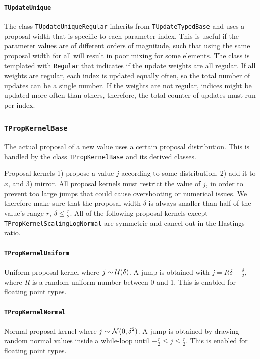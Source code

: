 \documentclass[a4paper,11pt]{article}
\newcommand{\class}[1]{\texttt{#1}}
\newcommand{\template}[1]{\texttt{#1}}
\begin{document}
\paragraph{\class{TUpdateUnique}}
The class \class{TUpdateUniqueRegular} inherits from \class{TUpdateTypedBase} and uses a proposal width that is specific to each parameter index. This is useful if the parameter values are of different orders of magnitude, such that using the same proposal width for all will result in poor mixing for some elements. The class is templated with \template{Regular} that indicates if the update weights are all regular. If all weights are regular, each index is updated equally often, so the total number of updates can be a single number. If the weights are not regular, indices might be updated more often than others, therefore, the total counter of updates must run per index.

\subsubsection{\class{TPropKernelBase}}
The actual proposal of a new value uses a certain proposal distribution. This is handled by the class \class{TPropKernelBase} and its derived classes.

Proposal kernels 1) propose a value $j$ according to some distribution, 2) add it to $x$, and 3) mirror. All proposal kernels must restrict the value of $j$, in order to prevent too large jumps that could cause overshooting or numerical issues. We therefore make sure that the proposal width $\delta$ is always smaller than half of the value's range $r$, $\delta \leq \frac{r}{2}$.
All of the following proposal kernels except \class{TPropKernelScalingLogNormal} are symmetric and cancel out in the Hastings ratio.

\paragraph{\class{TPropKernelUniform}}
 Uniform proposal kernel where $j \sim {\cal U}(\delta)$. A jump is obtained with $j = R \delta - \frac{\delta}{2}$, where $R$ is a random uniform number between 0 and 1. This is enabled for floating point types.

\paragraph{\class{TPropKernelNormal}}
Normal proposal kernel where $j \sim {\cal N}(0, \delta^2)$. A jump is obtained by drawing random normal values inside a while-loop until $-\frac{r}{2} \leq j \leq \frac{r}{2}$. This is enabled for floating point types.
\end{document}
